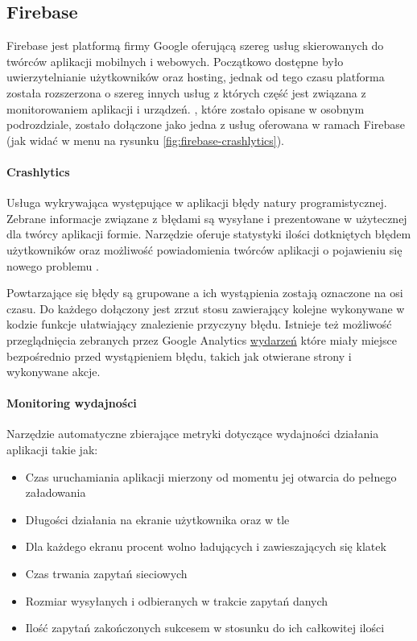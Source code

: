 \subsection{Firebase}
\label{sec:firebase}
Firebase jest platformą firmy Google oferującą szereg usług skierowanych do twórców aplikacji mobilnych i webowych. Początkowo dostępne było uwierzytelnianie użytkowników oraz hosting, jednak od tego czasu platforma została rozszerzona o szereg innych usług z których część jest związana z monitorowaniem aplikacji i urządzeń. , które zostało opisane w osobnym podrozdziale, zostało dołączone jako jedna z usług oferowana w ramach Firebase (jak widać w menu na rysunku \ref{fig:firebase-crashlytics}).


\paragraph{Crashlytics}
Usługa wykrywająca występujące w aplikacji błędy natury programistycznej. Zebrane informacje związane z błędami są wysyłane i prezentowane w użytecznej dla twórcy aplikacji formie. Narzędzie oferuje statystyki ilości dotkniętych błędem użytkowników oraz możliwość powiadomienia twórców aplikacji o pojawieniu się nowego problemu \cite{Fb_Crashlytics}.

Powtarzające się błędy są grupowane a ich wystąpienia zostają oznaczone na osi czasu. Do każdego dołączony jest zrzut stosu zawierający kolejne wykonywane w kodzie funkcje ułatwiający znalezienie przyczyny błędu. Istnieje też możliwość przeglądnięcia zebranych przez Google Analytics \hyperref[par:ga-events]{wydarzeń} które miały miejsce bezpośrednio przed wystąpieniem błędu, takich jak otwierane strony i wykonywane akcje. 

\paragraph{Monitoring wydajności}
Narzędzie automatyczne zbierające metryki dotyczące wydajności działania aplikacji takie jak:
\begin{itemize}
	\item Czas uruchamiania aplikacji mierzony od momentu jej otwarcia do pełnego załadowania
	\item Długości działania na ekranie użytkownika oraz w tle
	\item Dla każdego ekranu procent wolno ładujących i zawieszających się klatek
	\item Czas trwania zapytań sieciowych
	\item Rozmiar wysyłanych i odbieranych w trakcie zapytań danych
	\item Ilość zapytań zakończonych sukcesem w stosunku do ich całkowitej ilości
\end{itemize}
\bigskip

